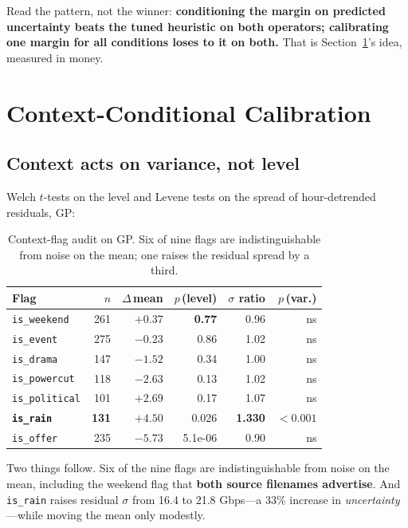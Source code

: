 \documentclass[conference]{IEEEtran}
\newcommand{\gpx}{GP}
\begin{document}
Read the pattern, not the winner: \textbf{conditioning the margin on predicted
uncertainty beats the tuned heuristic on both operators; calibrating one margin for all
conditions loses to it on both.} That is Section~\ref{sec:context}'s idea, measured in
money.

\section{Context-Conditional Calibration}
\label{sec:context}

\subsection{Context acts on variance, not level}

Welch $t$-tests on the level and Levene tests on the spread of hour-detrended
residuals, \gpx:

\begin{table}[htbp]
\caption{Context-flag audit on \gpx. Six of nine flags are indistinguishable from noise
on the mean; one raises the residual spread by a third.}
\label{tab:flags}
\centering
\setlength{\tabcolsep}{4pt}
\begin{tabular}{lrrrrr}
\toprule
\textbf{Flag} & $n$ & $\Delta$\,mean & $p$\,(level) & $\sigma$ ratio & $p$\,(var.) \\
\midrule
\texttt{is\_weekend} & 261 & $+0.37$ & \textbf{0.77} & 0.96 & ns \\
\texttt{is\_event} & 275 & $-0.23$ & 0.86 & 1.02 & ns \\
\texttt{is\_drama} & 147 & $-1.52$ & 0.34 & 1.00 & ns \\
\texttt{is\_powercut} & 118 & $-2.63$ & 0.13 & 1.02 & ns \\
\texttt{is\_political} & 101 & $+2.69$ & 0.17 & 1.07 & ns \\
\textbf{\texttt{is\_rain}} & \textbf{131} & $+4.50$ & 0.026 & \textbf{1.330} & $\mathbf{<0.001}$ \\
\texttt{is\_offer} & 235 & $-5.73$ & 5.1e-06 & 0.90 & ns \\
\bottomrule
\end{tabular}
\end{table}

Two things follow. Six of the nine flags are indistinguishable from noise on the mean,
including the weekend flag that \textbf{both source filenames advertise}. And
\texttt{is\_rain} raises residual $\sigma$ from 16.4 to 21.8 Gbps---a 33\% increase in
\emph{uncertainty}---while moving the mean only modestly.
\end{document}
